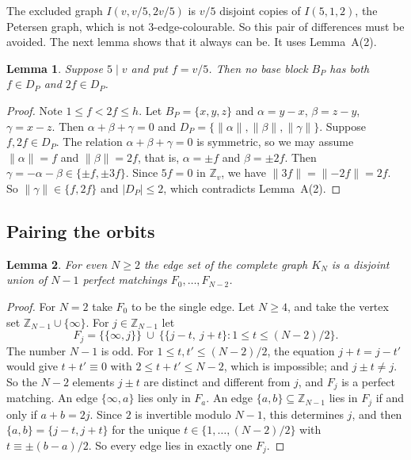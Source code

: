 \documentclass[11pt]{amsart}
\theoremstyle{plain}
\newcommand{\letteredname}{}
\newtheorem*{letteredinner}{Lemma \letteredname}
\newenvironment{lettered}[1]{\renewcommand{\letteredname}{#1}\begin{letteredinner}}{\end{letteredinner}}
\theoremstyle{definition}
\theoremstyle{remark}
\numberwithin{equation}{section}
\newcommand{\Z}{\mathbb{Z}}
\newcommand{\nrm}[1]{\lVert #1\rVert}
\newcommand{\abs}[1]{\lvert #1\rvert}
\begin{document}
The excluded graph \(I(v,v/5,2v/5)\) is \(v/5\) disjoint copies of \(I(5,1,2)\), the Petersen graph, which is not \(3\)-edge-colourable. So this pair of differences must be avoided. The next lemma shows that it always can be. It uses Lemma~A(2).

\begin{lettered}{E (\(v/5\) and \(2v/5\) lie in different orbits)}
Suppose \(5\mid v\) and put \(f=v/5\). Then no base block \(B_P\) has both \(f\in D_P\) and \(2f\in D_P\).
\end{lettered}

\begin{proof}
Note \(1\le f<2f\le h\). Let \(B_P=\{x,y,z\}\) and \(\alpha=y-x\), \(\beta=z-y\), \(\gamma=x-z\). Then \(\alpha+\beta+\gamma=0\) and \(D_P=\{\nrm{\alpha},\nrm{\beta},\nrm{\gamma}\}\). Suppose \(f,2f\in D_P\). The relation \(\alpha+\beta+\gamma=0\) is symmetric, so we may assume \(\nrm{\alpha}=f\) and \(\nrm{\beta}=2f\), that is, \(\alpha=\pm f\) and \(\beta=\pm2f\). Then \(\gamma=-\alpha-\beta\in\{\pm f,\pm3f\}\). Since \(5f=0\) in \(\Z_v\), we have \(\nrm{3f}=\nrm{-2f}=2f\). So \(\nrm{\gamma}\in\{f,2f\}\) and \(\abs{D_P}\le2\), which contradicts Lemma~A(2).
\end{proof}

\subsection{Pairing the orbits}

\begin{lettered}{F (\(1\)-factorization of \(K_N\))}
For even \(N\ge2\) the edge set of the complete graph \(K_N\) is a disjoint union of \(N-1\) perfect matchings \(F_0,\dots,F_{N-2}\).
\end{lettered}

\begin{proof}
For \(N=2\) take \(F_0\) to be the single edge. Let \(N\ge4\), and take the vertex set \(\Z_{N-1}\cup\{\infty\}\). For \(j\in\Z_{N-1}\) let
\[
F_j=\bigl\{\{\infty,j\}\bigr\}\ \cup\ \bigl\{\{j-t,\ j+t\} : 1\le t\le (N-2)/2\bigr\}.
\]
The number \(N-1\) is odd. For \(1\le t,t'\le(N-2)/2\), the equation \(j+t=j-t'\) would give \(t+t'\equiv0\) with \(2\le t+t'\le N-2\), which is impossible; and \(j\pm t\ne j\). So the \(N-2\) elements \(j\pm t\) are distinct and different from \(j\), and \(F_j\) is a perfect matching. An edge \(\{\infty,a\}\) lies only in \(F_a\). An edge \(\{a,b\}\subseteq\Z_{N-1}\) lies in \(F_j\) if and only if \(a+b=2j\). Since \(2\) is invertible modulo \(N-1\), this determines \(j\), and then \(\{a,b\}=\{j-t,j+t\}\) for the unique \(t\in\{1,\dots,(N-2)/2\}\) with \(t\equiv\pm(b-a)/2\). So every edge lies in exactly one \(F_j\).
\end{proof}
\end{document}
